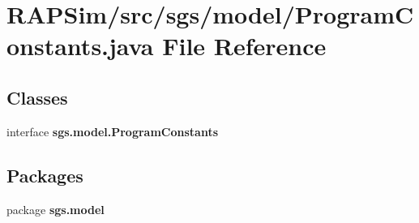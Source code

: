 \section{R\-A\-P\-Sim/src/sgs/model/\-Program\-Constants.java File Reference}
\label{_program_constants_8java}
\subsection*{Classes}
\begin{DoxyCompactItemize}
\item 
interface {\bf sgs.\-model.\-Program\-Constants}
\end{DoxyCompactItemize}
\subsection*{Packages}
\begin{DoxyCompactItemize}
\item 
package {\bf sgs.\-model}
\end{DoxyCompactItemize}
